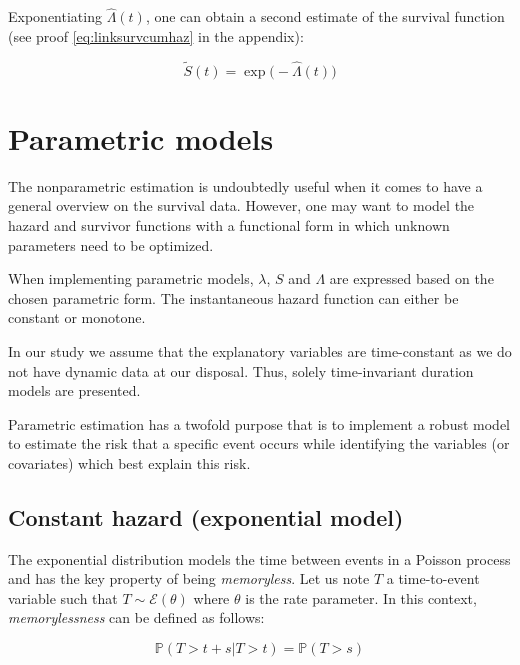 \documentclass[
]{book}
\begin{document}
Exponentiating \(\hat{\Lambda}(t)\), one can obtain a second estimate of the survival function (see proof \eqref{eq:linksurvcumhaz} in the appendix):

\begin{equation}
    \tilde{S}(t) = \exp \big( -\hat{\Lambda}(t) \big)
    \label{eq:survest}
\end{equation}

\hypertarget{parametric-models}{%
\section{Parametric models}\label{parametric-models}}

The nonparametric estimation is undoubtedly useful when it comes to have a general overview on the survival data. However, one may want to model the hazard and survivor functions with a functional form in which unknown parameters need to be optimized.

When implementing parametric models, \(\lambda\), \(S\) and \(\Lambda\) are expressed based on the chosen parametric form. The instantaneous hazard function can either be constant or monotone.

In our study we assume that the explanatory variables are time-constant as we do not have dynamic data at our disposal. Thus, solely time-invariant duration models are presented.

Parametric estimation has a twofold purpose that is to implement a robust model to estimate the risk that a specific event occurs while identifying the variables (or covariates) which best explain this risk.

\hypertarget{constant-hazard-exponential-model}{%
\subsection{Constant hazard (exponential model)}\label{constant-hazard-exponential-model}}

The exponential distribution models the time between events in a Poisson process and has the key property of being \emph{memoryless}. Let us note \(T\) a time-to-event variable such that \(T \sim \mathcal{E}(\theta)\) where \(\theta\) is the rate parameter. In this context, \emph{memorylessness} can be defined as follows:

\begin{equation}
  \mathbb{P}(T>t+s | T > t) = \mathbb{P}(T>s)
  \label{eq:memorylessness}
\end{equation}
\end{document}
